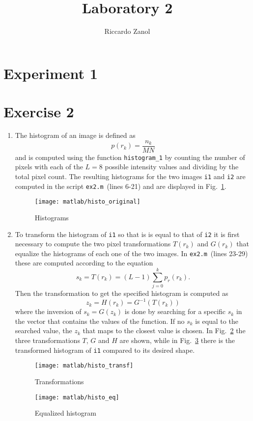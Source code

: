 \documentclass{article}
\author{Riccardo Zanol}
\title{Laboratory 2}
\newcommand{\includecode}[1]{}
\newcommand{\inlinecode}[1]{\lstinline[basicstyle=\ttfamily,keywordstyle={}]{#1}}
\begin{document}
\maketitle
\section*{Experiment 1}
\section*{Exercise 2}
\begin{enumerate}
\item The histogram of an image is defined as
  \[ p(r_k) = \frac{n_k}{MN} \]
  and is computed using the function \inlinecode{histogram_1} by
  counting the number of pixels with each of the $L=8$ possible
  intensity values and dividing by the total pixel count. The
  resulting histograms for the two images \inlinecode{i1} and
  \inlinecode{i2} are computed in the script \inlinecode{ex2.m}~(lines
  6-21) and are displayed in Fig.~\ref{plot:histo_original}.
  \begin{figure}[h]
    \centering
    \texttt{[image: matlab/histo\_original]}
    \caption{Histograms}
    \label{plot:histo_original}
  \end{figure}
\item To transform the histogram of \inlinecode{i1} so that is is
  equal to that of \inlinecode{i2} it is first necessary to compute
  the two pixel transformations $T(r_k)$ and $G(r_k)$ that equalize
  the histograms of each one of the two images. In
  \inlinecode{ex2.m}~(lines 23-29) these are computed according to the
  equation
  \[ s_k = T(r_k) = (L-1)\sum_{j=0}^kp_r(r_k) . \]
  Then the transformation to get the specified histogram is computed as
  \[ z_k = H(r_k) = G^{-1}(T(r_k)) \]
  where the inversion of $s_k = G(z_k)$ is done by searching for a
  specific $s_k$ in the vector that contains the values of the
  function. If no $s_k$ is equal to the searched value, the $z_k$ that
  maps to the closest value is chosen. In Fig.~\ref{plot:histo_transf}
  the three transformations $T$, $G$ and $H$ are shown, while in
  Fig.~\ref{plot:histo_eq} there is the transformed histogram of
  \inlinecode{i1} compared to its desired shape.
  \begin{figure}[h]
    \centering
    \texttt{[image: matlab/histo\_transf]}
    \caption{Transformations}
    \label{plot:histo_transf}
  \end{figure}
  \begin{figure}[h]
    \centering
    \texttt{[image: matlab/histo\_eq]}
    \caption{Equalized histogram}
    \label{plot:histo_eq}
  \end{figure}  
\end{enumerate}
\end{document}
